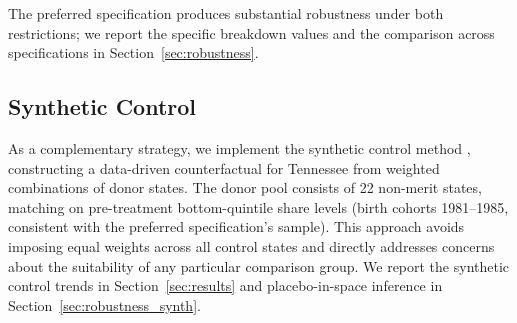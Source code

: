 \noindent The preferred specification produces substantial robustness
under both restrictions; we report the specific breakdown values and
the comparison across specifications in
Section~\ref{sec:robustness}.

\subsection{Synthetic Control}

As a complementary strategy, we implement the synthetic control method
\parencite{abadie2010synthetic}, constructing a data-driven
counterfactual for Tennessee from weighted combinations of donor
states. The donor pool consists of 22 non-merit states, matching on
pre-treatment bottom-quintile share levels (birth cohorts 1981--1985,
consistent with the preferred specification's sample). This approach
avoids imposing equal weights across all control states and directly
addresses concerns about the suitability of any particular comparison
group. We report the synthetic control trends in
Section~\ref{sec:results} and placebo-in-space inference in
Section~\ref{sec:robustness_synth}.
